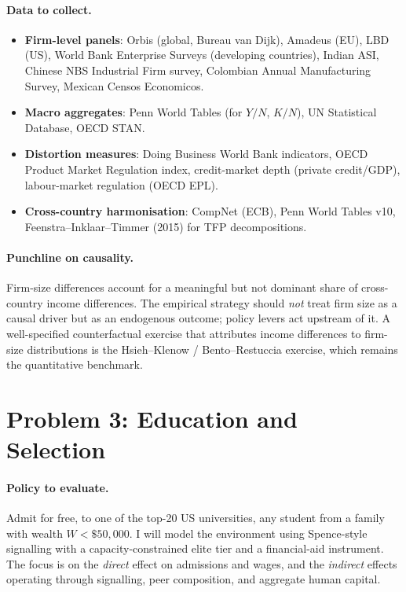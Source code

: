 \documentclass[11pt,a4paper]{article}
\begin{document}
\paragraph{Data to collect.}
\begin{itemize}[leftmargin=*,itemsep=1pt]
    \item \textbf{Firm-level panels}: Orbis (global, Bureau van Dijk), Amadeus (EU), LBD (US), World Bank Enterprise Surveys (developing countries), Indian ASI, Chinese NBS Industrial Firm survey, Colombian Annual Manufacturing Survey, Mexican Censos Economicos.
    \item \textbf{Macro aggregates}: Penn World Tables (for $Y/N$, $K/N$), UN Statistical Database, OECD STAN.
    \item \textbf{Distortion measures}: Doing Business World Bank indicators, OECD Product Market Regulation index, credit-market depth (private credit/GDP), labour-market regulation (OECD EPL).
    \item \textbf{Cross-country harmonisation}: CompNet (ECB), Penn World Tables v10, Feenstra--Inklaar--Timmer (2015) for TFP decompositions.
\end{itemize}

\paragraph{Punchline on causality.}
Firm-size differences account for a meaningful but not dominant share of cross-country income differences. The empirical strategy should \emph{not} treat firm size as a causal driver but as an endogenous outcome; policy levers act upstream of it. A well-specified counterfactual exercise that attributes income differences to firm-size distributions is the Hsieh--Klenow / Bento--Restuccia exercise, which remains the quantitative benchmark.

\section*{Problem 3: Education and Selection}

\paragraph{Policy to evaluate.}
Admit for free, to one of the top-20 US universities, any student from a family with wealth $W<\$50{,}000$. I will model the environment using Spence-style signalling with a capacity-constrained elite tier and a financial-aid instrument. The focus is on the \emph{direct} effect on admissions and wages, and the \emph{indirect} effects operating through signalling, peer composition, and aggregate human capital.
\end{document}
